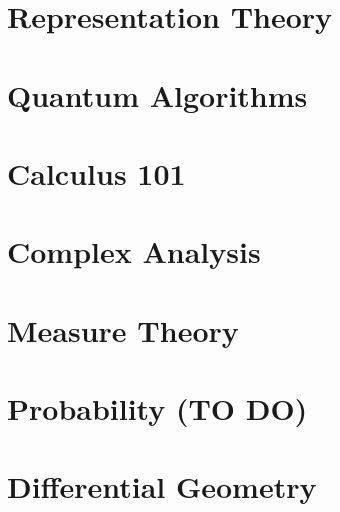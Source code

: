 \documentclass[11pt,twoside=semi,openright,numbers=noenddot]{scrbook}
\begin{document}
\part{Representation Theory}
\label{part:repth}
\parttoc





\part{Quantum Algorithms}
\label{part:quantum}
\parttoc




\part{Calculus 101}
\label{part:calc}
\parttoc






\part{Complex Analysis}
\label{part:cmplxana}
\parttoc




\part{Measure Theory}
\label{part:measure}
\parttoc






\part{Probability (TO DO)}
\label{part:prob}
\parttoc



\part{Differential Geometry}
\label{part:diffgeo}
\parttoc


\end{document}
